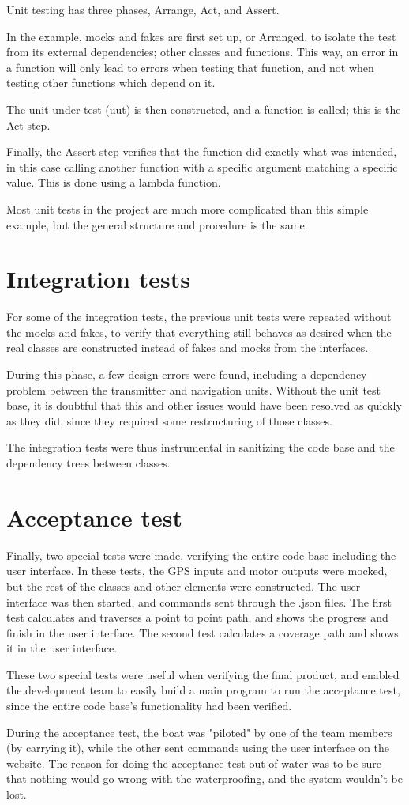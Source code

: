 Unit testing has three phases, Arrange, Act, and Assert. 

In the example, mocks and fakes are first set up, or Arranged, to isolate the test from its external dependencies; other classes and functions. This way, an error in a function will only lead to errors when testing that function, and not when testing other functions which depend on it. 

The unit under test (uut) is then constructed, and a function is called; this is the Act step. 

Finally, the Assert step verifies that the function did exactly what was intended, in this case calling another function with a specific argument matching a specific value. This is done using a lambda function.

Most unit tests in the project are much more complicated than this simple example, but the general structure and procedure is the same. 

\section{Integration tests}

For some of the integration tests, the previous unit tests were repeated without the mocks and fakes, to verify that everything still behaves as desired when the real classes are constructed instead of fakes and mocks from the interfaces.

During this phase, a few design errors were found, including a dependency problem between the transmitter and navigation units. Without the unit test base, it is doubtful that this and other issues would have been resolved as quickly as they did, since they required some restructuring of those classes. 

The integration tests were thus instrumental in sanitizing the code base and the dependency trees between classes.

\section{Acceptance test}
Finally, two special tests were made, verifying the entire code base including the user interface. In these tests, the GPS inputs and motor outputs were mocked, but the rest of the classes and other elements were constructed. The user interface was then started, and commands sent through the .json files. The first test calculates and traverses a point to point path, and shows the progress and finish in the user interface. The second test calculates a coverage path and shows it in the user interface.

These two special tests were useful when verifying the final product, and enabled the development team to easily build a main program to run the acceptance test, since the entire code base's functionality had been verified.

During the acceptance test, the boat was "piloted" by one of the team members (by carrying it), while the other sent commands using the user interface on the website. The reason for doing the acceptance test out of water was to be sure that nothing would go wrong with the waterproofing, and the system wouldn't be lost. 